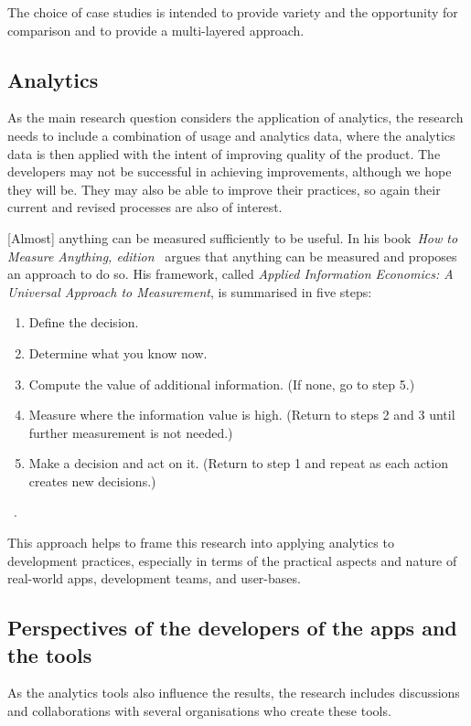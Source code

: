 
The choice of case studies is intended to provide variety and the opportunity for comparison and to provide a multi-layered approach.


\subsection{Analytics}
As the main research question considers the application of analytics, the research needs to include a combination of usage and analytics data, where the analytics data is then applied with the intent of improving quality of the product. The developers may not be successful in achieving improvements, although we hope they will be. They may also be able to improve their practices, so again their current and revised processes are also of interest.

[Almost] anything can be measured sufficiently to be useful. In his book~\emph{How to Measure Anything,  edition}~ argues that anything can be measured and proposes an approach to do so. His framework, called \emph{Applied Information Economics: A Universal Approach to Measurement}, is summarised in five steps:

\begin{enumerate}
    \item Define the decision.
    \item Determine what you know now.
    \item Compute the value of additional information. (If none, go to step 5.)
    \item Measure where the information value is high. (Return to steps 2 and 3 until further measurement is not needed.)
    \item Make a decision and act on it. (Return to step 1 and repeat as each action creates new decisions.)
\end{enumerate} ~\cite[p.9]{hubbard2014measure}.

This approach helps to frame this research into applying analytics to development practices, especially in terms of the practical aspects and nature of real-world apps, development teams, and user-bases.


\subsection{Perspectives of the developers of the apps and the tools}
As the analytics tools also influence the results, the research includes discussions and collaborations with several organisations who create these tools.


